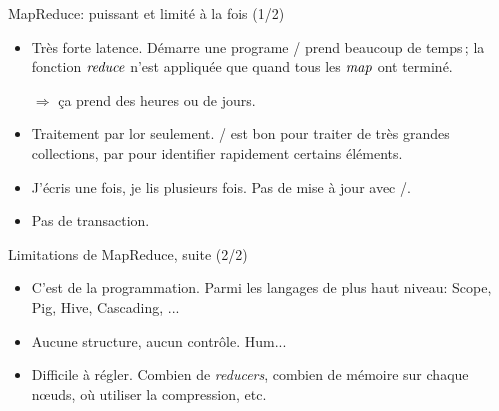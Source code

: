 \begin{frame}{MapReduce: puissant et limité à la fois (1/2)}

\begin{itemize}

\item \alert{Très forte latence.} Démarre une programe \mapreduce/ prend
\alert{beaucoup} de temps\,; la fonction $\mathop{\mathit{reduce}}$ n'est appliquée
que quand tous les $\mathop{\mathit{map}}$ ont terminé.

    $\Rightarrow$ ça prend des heures ou de jours.
    

\item \alert{Traitement par lor seulement.} \mapreduce/ est bon
   pour traiter de très grandes collections, par pour identifier
     rapidement certains éléments.

\item \alert{J'écris une fois, je lis plusieurs fois.} Pas de mise à jour
  avec \mapreduce/.

\item \alert{Pas de transaction.} 

\end{itemize}
\end{frame}

\begin{frame}{Limitations de MapReduce, suite   (2/2)}
\begin{itemize}
\item \alert{C'est de la programmation.} Parmi les langages de plus haut niveau: Scope, Pig,
 Hive, Cascading, ...

\item \alert{Aucune structure, aucun contrôle}. Hum...

\item \alert{Difficile à régler.} Combien de \textit{reducers}, combien de mémoire
sur chaque n{\oe}uds, où utiliser la compression, etc.

\end{itemize}

\end{frame}

